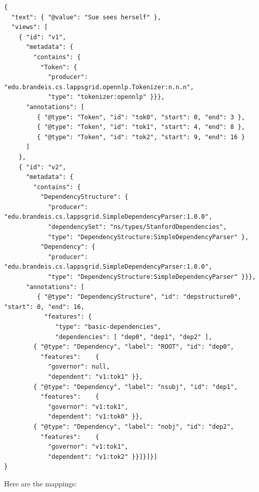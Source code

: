 \documentclass[11pt]{article}
\newenvironment{example}
    {\begin{tcolorbox}\small}
    {\end{tcolorbox}}
\begin{document}
\begin{example}
\begin{verbatim}
{
  "text": { "@value": "Sue sees herself" },
  "views": [
    { "id": "v1",
      "metadata": {
        "contains": {
          "Token": {
            "producer": "edu.brandeis.cs.lappsgrid.opennlp.Tokenizer:n.n.n",
            "type": "tokenizer:opennlp" }}},
      "annotations": [
         { "@type": "Token", "id": "tok0", "start": 0, "end": 3 },
         { "@type": "Token", "id": "tok1", "start": 4, "end": 8 },
         { "@type": "Token", "id": "tok2", "start": 9, "end": 16 }
      ]
    },
    { "id": "v2",
      "metadata": {
        "contains": {
          "DependencyStructure": {
            "producer": "edu.brandeis.cs.lappsgrid.SimpleDependencyParser:1.0.0",
            "dependencySet": "ns/types/StanfordDependencies",
            "type": "DependencyStructure:SimpleDependencyParser" },
          "Dependency": {
            "producer": "edu.brandeis.cs.lappsgrid.SimpleDependencyParser:1.0.0",
            "type": "DependencyStructure:SimpleDependencyParser" }}},
      "annotations": [
         { "@type": "DependencyStructure", "id": "depstructure0", "start": 0, "end": 16,
           "features": {
              "type": "basic-dependencies",
              "dependencies": [ "dep0", "dep1", "dep2" ],
        { "@type": "Dependency", "label": "ROOT", "id": "dep0",
          "features":    {
            "governor": null,
            "dependent": "v1:tok1" }},
        { "@type": "Dependency", "label": "nsubj", "id": "dep1",
          "features":    {
            "governor": "v1:tok1",
            "dependent": "v1:tok0" }},
        { "@type": "Dependency", "label": "nobj", "id": "dep2",
          "features":    {
            "governor": "v1:tok1",
            "dependent": "v1:tok2" }}]}]}]
}
\end{verbatim}
\end{example}

\newpage

Here are the mappings:
\end{document}
